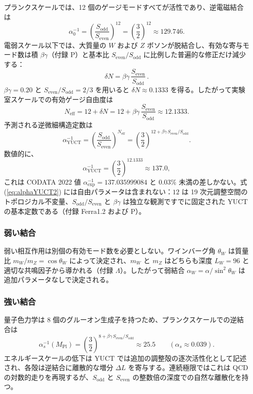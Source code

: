 \documentclass[12pt,a4paper]{article}
\begin{document}
	プランクスケールでは、12 個のゲージモードすべてが活性であり、逆電磁結合は
	\begin{equation}
		\alpha_0^{-1} = \left(\frac{S_{\mathrm{odd}}}{S_{\mathrm{even}}}\right)^{\!12}
		= \left(\frac{3}{2}\right)^{\!12} \approx 129.746 .
	\end{equation}
	電弱スケール以下では、大質量の \(W\) および \(Z\) ボソンが脱結合し、有効な寄与モード数は積 \(\beta\gamma\)（付録 P）と基本比 \(S_{\mathrm{even}}/S_{\mathrm{odd}}\) に比例した普遍的な修正だけ減少する：
	\begin{equation}
		\delta N = \beta\gamma\,\frac{S_{\mathrm{even}}}{S_{\mathrm{odd}}}\, .
		\label{eq:deltaN2}
	\end{equation}
	\(\beta\gamma = 0.20\) と \(S_{\mathrm{even}}/S_{\mathrm{odd}} = 2/3\) を用いると \(\delta N \approx 0.1333\) を得る。したがって実験室スケールでの有効ゲージ自由度は
	\begin{equation}
		N_{\mathrm{eff}} = 12 + \delta N = 12 + \beta\gamma\,\frac{S_{\mathrm{even}}}{S_{\mathrm{odd}}}
		\approx 12.1333 .
	\end{equation}
	予測される逆微細構造定数は
	\begin{equation}
		\boxed{\alpha^{-1}_{\mathrm{YUCT}} =
			\left(\frac{S_{\mathrm{odd}}}{S_{\mathrm{even}}}\right)^{\!N_{\mathrm{eff}}}
			= \left(\frac{3}{2}\right)^{\!12 + \beta\gamma\,S_{\mathrm{even}}/S_{\mathrm{odd}}} } .
		\label{eq:alphaYUCT2}
	\end{equation}
	数値的に、
	\[
	\alpha^{-1}_{\mathrm{YUCT}} = \left(\frac{3}{2}\right)^{\!12.1333} \approx 137.0 ,
	\]
	これは CODATA 2022 値 \(\alpha^{-1}_{\mathrm{exp}} = 137.035999084\) と \(0.03\%\) 未満の差しかない。式 (\ref{eq:alphaYUCT2}) には自由パラメータは含まれない：\(12\) は 19 次元調整空間のトポロジカル不変量、\(S_{\mathrm{odd}}/S_{\mathrm{even}}\) と \(\beta\gamma\) は独立な観測ですでに固定された YUCT の基本定数である（付録 Ferra1.2 および P）。
	
	\subsubsection{弱い結合}
	弱い相互作用は別個の有効モード数を必要としない。ワインバーグ角 \(\theta_W\) は質量比 \(m_W/m_Z = \cos\theta_W\) によって決定され、\(m_W\) と \(m_Z\) はどちらも深度 \(L_W = 96\) と適切な共鳴因子から導かれる（付録 \(\Lambda\)）。したがって弱結合 \(\alpha_W = \alpha/\sin^2\theta_W\) は追加パラメータなしで決定される。
	
	\subsubsection{強い結合}
	量子色力学は 8 個のグルーオン生成子を持つため、プランクスケールでの逆結合は
	\begin{equation}
		\alpha_s^{-1}(M_{\mathrm{Pl}}) = \left(\frac{3}{2}\right)^{\!8 + \beta\gamma\,S_{\mathrm{even}}/S_{\mathrm{odd}}}
		\approx 25.5 \qquad (\alpha_s \approx 0.039) .
	\end{equation}
	エネルギースケールの低下は YUCT では追加の調整殻の逐次活性化として記述され、各殻は逆結合に離散的な増分 \(\Delta L\) を寄与する。連続極限ではこれは QCD の対数的走りを再現するが、\(S_{\mathrm{odd}}\) と \(S_{\mathrm{even}}\) の整数倍の深度での自然な離散化を持つ。
	
\end{document}
